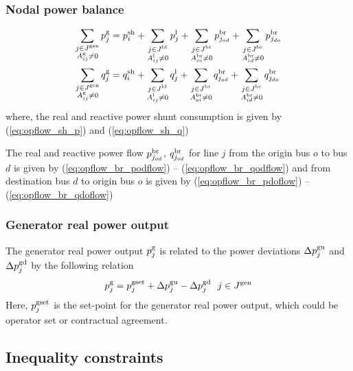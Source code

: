 \subsubsection{Nodal power balance}
\begin{align}
\sum_{\substack{j \in J^\text{gen} \\ A^{\text{g}}_{ij} \neq 0}} p^\text{g}_j &=   p^{\text{sh}}_i + \sum_{\substack{j \in J^\text{ld} \\ A^{\text{l}}_{ij} \neq 0}} p^{\text{l}}_j + \sum_{\substack{j \in J^\text{br} \\ A^{\text{br}}_{oi} \neq 0}} p^\text{br}_{j_{od}} + \sum_{\substack{j \in J^\text{br} \\ A^{\text{br}}_{id} \neq 0}} p^\text{br}_{j_{do}} \\
\sum_{\substack{j \in J^\text{gen} \\ A^{\text{g}}_{ij} \neq 0}} q^\text{g}_j &=  q^{\text{sh}}_i + \sum_{\substack{j \in J^\text{ld} \\ A^{\text{l}}_{ij} \neq 0}} q^{\text{l}}_j +
\sum_{\substack{j \in J^\text{br} \\ A^{\text{br}}_{oi} \neq 0}} q^\text{br}_{j_{od}} + \sum_{\substack{j \in J^\text{br} \\ A^{\text{br}}_{id} \neq 0}} q^\text{br}_{j_{do}} \\
\end{align}
where, the real and reactive power shunt consumption is given by (\ref{eq:opflow_sh_p}) and (\ref{eq:opflow_sh_q})


The real and reactive power flow $p^\text{br}_{j_{od}}$, $q^\text{br}_{j_{od}}$ for line $j$ from the origin bus $o$ to bus $d$ is given by (\ref{eq:opflow_br_podflow}) -- 
 (\ref{eq:opflow_br_qodflow})
and from destination bus $d$ to origin bus $o$ is given by (\ref{eq:opflow_br_pdoflow}) -- 
 (\ref{eq:opflow_br_qdoflow})

\subsubsection{Generator real power output}

The generator real power output $p^\text{g}_j$ is related to the power deviations $\Delta{p}^\text{gu}_j$ and $\Delta{p}^\text{gd}_j$ by the following relation
\begin{equation}
  p^\text{g}_j = p^{\text{gset}}_j + \Delta{p}^\text{gu}_j - \Delta{p}^\text{gd}_j ~~j \in J^\text{gen}
  \label{eq:opflow_eq_gen}
\end{equation}
Here, $p^{\text{gset}}_j$ is the set-point for the generator real power output, which could be operator set or contractual agreement.

\subsection{Inequality constraints}

